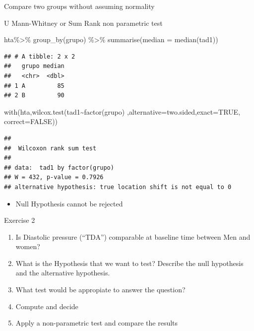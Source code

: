 \documentclass[
  ignorenonframetext,
]{beamer}
\newenvironment{Shaded}{\begin{snugshade}}{\end{snugshade}}
\newcommand{\AttributeTok}[1]{\textcolor[rgb]{0.77,0.63,0.00}{#1}}
\newcommand{\ConstantTok}[1]{\textcolor[rgb]{0.00,0.00,0.00}{#1}}
\newcommand{\FunctionTok}[1]{\textcolor[rgb]{0.00,0.00,0.00}{#1}}
\newcommand{\NormalTok}[1]{#1}
\newcommand{\SpecialCharTok}[1]{\textcolor[rgb]{0.00,0.00,0.00}{#1}}
\newcommand{\StringTok}[1]{\textcolor[rgb]{0.31,0.60,0.02}{#1}}
\providecommand{\tightlist}{%
  \setlength{\itemsep}{0pt}\setlength{\parskip}{0pt}}
\begin{document}
\begin{frame}[fragile]{Compare two groups without assuming normality}
\protect\hypertarget{compare-two-groups-without-assuming-normality}{}
\begin{block}{U Mann-Whitney or Sum Rank non parametric test}
\protect\hypertarget{u-mann-whitney-or-sum-rank-non-parametric-test}{}
\tiny

\begin{Shaded}
\begin{Highlighting}[]
\NormalTok{hta}\SpecialCharTok{\%\textgreater{}\%} 
  \FunctionTok{group\_by}\NormalTok{(grupo) }\SpecialCharTok{\%\textgreater{}\%} 
  \FunctionTok{summarise}\NormalTok{(}\AttributeTok{median =} \FunctionTok{median}\NormalTok{(tad1)) }
\end{Highlighting}
\end{Shaded}

\begin{verbatim}
## # A tibble: 2 x 2
##   grupo median
##   <chr>  <dbl>
## 1 A         85
## 2 B         90
\end{verbatim}

\begin{Shaded}
\begin{Highlighting}[]
\FunctionTok{with}\NormalTok{(hta,}\FunctionTok{wilcox.test}\NormalTok{(tad1}\SpecialCharTok{\textasciitilde{}}\FunctionTok{factor}\NormalTok{(grupo)}
\NormalTok{    ,}\AttributeTok{alternative=}\StringTok{\textquotesingle{}two.sided\textquotesingle{}}\NormalTok{,}\AttributeTok{exact=}\ConstantTok{TRUE}\NormalTok{, }\AttributeTok{correct=}\ConstantTok{FALSE}\NormalTok{))}
\end{Highlighting}
\end{Shaded}

\begin{verbatim}
## 
##  Wilcoxon rank sum test
## 
## data:  tad1 by factor(grupo)
## W = 432, p-value = 0.7926
## alternative hypothesis: true location shift is not equal to 0
\end{verbatim}

\begin{itemize}
\tightlist
\item
  Null Hypothesis cannot be rejected
\end{itemize}
\end{block}
\end{frame}

\begin{frame}{Exercise 2}
\protect\hypertarget{exercise-2}{}
\begin{enumerate}
\tightlist
\item
  Is Diastolic pressure (``TDA'') comparable at baseline time between
  Men and women?
\item
  What is the Hypothesis that we want to test? Describe the null
  hypothesis and the alternative hypothesis.
\item
  What test would be appropiate to answer the question?
\item
  Compute and decide
\item
  Apply a non-parametric test and compare the results
\end{enumerate}
\end{frame}
\end{document}
